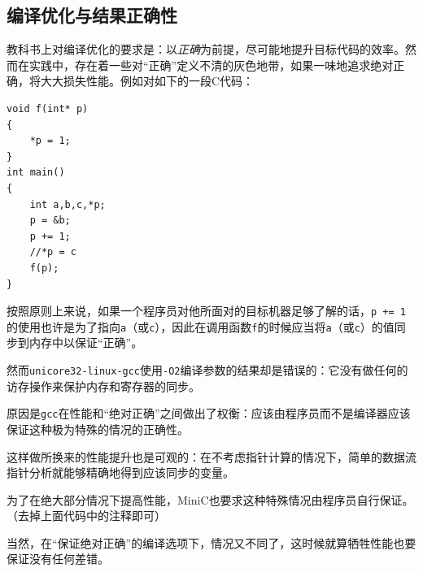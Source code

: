 \subsection*{编译优化与结果正确性}
教科书上对编译优化的要求是：以\emph{正确}为前提，尽可能地提升目标代码的效率。然而在实践中，存在着一些对“正确”定义不清的灰色地带，如果一味地追求绝对正确，将大大损失性能。例如对如下的一段C代码：
\begin{lstlisting}
void f(int* p)
{
	*p = 1;
}
int main()
{
	int a,b,c,*p;
	p = &b;
	p += 1;
	//*p = c 
	f(p);
}
\end{lstlisting}
按照原则上来说，如果一个程序员对他所面对的目标机器足够了解的话，\verb|p += 1|的使用也许是为了指向\verb|a|（或\verb|c|），因此在调用函数\verb|f|的时候应当将\verb|a|（或\verb|c|）的值同步到内存中以保证“正确”。

然而\verb|unicore32-linux-gcc|使用\verb|-O2|编译参数的结果却是错误的：它没有做任何的访存操作来保护内存和寄存器的同步。

原因是\verb|gcc|在性能和“绝对正确”之间做出了权衡：应该由程序员而不是编译器应该保证这种极为特殊的情况的正确性。

这样做所换来的性能提升也是可观的：在不考虑指针计算的情况下，简单的数据流指针分析就能够精确地得到应该同步的变量。

为了在绝大部分情况下提高性能，MiniC也要求这种特殊情况由程序员自行保证。（去掉上面代码中的注释即可）

当然，在“保证绝对正确”的编译选项下，情况又不同了，这时候就算牺牲性能也要保证没有任何差错。


